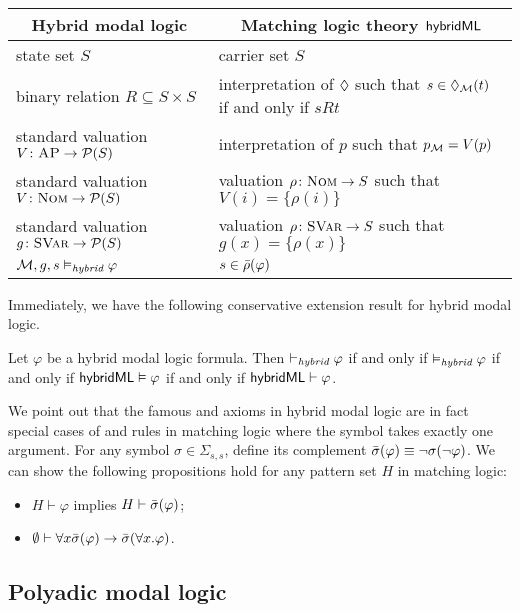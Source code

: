 \documentclass{amsart}
\begin{document}
\begin{center}
	\begin{tabular}{ll}
		\multicolumn{1}{c}{Hybrid modal logic} & 
		\multicolumn{1}{c}{Matching logic theory $\mathsf{hybridML}$}
		\\\hline
		state set $S$ & carrier set $S$
		\\
		binary relation $R \subseteq S \times S$ & interpretation of ${\lozenge}$ such
		that
		$s \in {\lozenge}_{\mathcal{M}} (t)$ if and only if $s R t$
		\\
		standard valuation $V \colon \textsc{AP} \to \mathcal{P}(S)$
		& interpretation of $p$ such that $p_{\mathcal{M}} = V(p)$
		\\
		standard valuation $V \colon \textnormal{\textsc{Nom}} \to \mathcal{P}(S)$
		& valuation $\rho \colon \textnormal{\textsc{Nom}} \to S$ such that
		$V(i) = \{ \rho(i) \}$
		\\
		standard valuation $g \colon {\normalfont\textsc{SVar}} \to \mathcal{P}(S)$
		& valuation $\rho \colon {\normalfont\textsc{SVar}} \to S$ such that
		$g(x) = \{ \rho(x) \}$
		\\
		$\mathcal{M},g,s \vDash_{\textit{hybrid}} \varphi$
		& $s \in \bar{\rho}(\varphi)$
	\end{tabular}
\end{center}
Immediately, we have the following conservative extension result for hybrid
modal logic.
\begin{theorem}
	Let $\varphi$ be a hybrid modal logic formula.
	Then
	$\vdash_{\textit{hybrid}} \varphi$ if and only if
	$\vDash_{\textit{hybrid}} \varphi$ if and only if 
	$\mathsf{hybridML} \vDash \varphi$ if and only if
	$\mathsf{hybridML} \vdash \varphi$.
\end{theorem}

We point out that the famous  and  axioms
in hybrid modal logic
are in fact special cases
of \propagationbottom and \propagationexists rules
in matching logic where the symbol takes exactly one argument.
For any symbol $\sigma \in \Sigma_{s,s}$,
define its complement $\bar{\sigma} (\varphi) \equiv \neg \sigma(\neg \varphi)$.
We can show the following propositions hold for
any pattern set $H$ in matching logic:
\begin{itemize}
	\item $H \vdash \varphi$ implies $H \vdash \bar{\sigma}(\varphi)$;
	\item $\emptyset \vdash \forall x \bar{\sigma}(\varphi) \to \bar{\sigma}(\forall x .
	\varphi)$.
\end{itemize}

\subsection{Polyadic modal logic}
\end{document}
